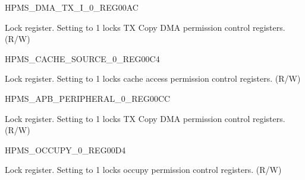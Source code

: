 \begin{register}{H}{PMS\_DMA\_TX\_I\_0\_REG}{\hexprefix{}00AC}\label{regdesc:PMSDMATXI0REG}
%
%
\regnewline%
\begin{regdesc}\begin{reglist}
\label{fielddesc:PMSDMATXILOCK}\item [PMS\_DMA\_TX\_I\_LOCK] Lock register. Setting to 1 locks TX Copy DMA permission control registers. (R/W)
\end{reglist}\end{regdesc}
\end{register}


\begin{register}{H}{PMS\_CACHE\_SOURCE\_0\_REG}{\hexprefix{}00C4}\label{regdesc:PMSCACHESOURCE0REG}
%
%
\regnewline%
\begin{regdesc}\begin{reglist}
\label{fielddesc:PMSCACHESOURCELOCK}\item [PMS\_CACHE\_SOURCE\_LOCK] Lock register. Setting to 1 locks cache access permission control registers. (R/W)
\end{reglist}\end{regdesc}
\end{register}


\begin{register}{H}{PMS\_APB\_PERIPHERAL\_0\_REG}{\hexprefix{}00CC}\label{regdesc:PMSAPBPERIPHERAL0REG}
%
%
\regnewline%
\begin{regdesc}\begin{reglist}
\label{fielddesc:PMSAPBPERIPHERALLOCK}\item [PMS\_APB\_PERIPHERAL\_LOCK] Lock register. Setting to 1 locks TX Copy DMA permission control registers. (R/W)
\end{reglist}\end{regdesc}
\end{register}


\begin{register}{H}{PMS\_OCCUPY\_0\_REG}{\hexprefix{}00D4}\label{regdesc:PMSOCCUPY0REG}
%
%
\regnewline%
\begin{regdesc}\begin{reglist}
\label{fielddesc:PMSOCCUPYLOCK}\item [PMS\_OCCUPY\_LOCK] Lock register. Setting to 1 locks occupy permission control registers. (R/W)
\end{reglist}\end{regdesc}
\end{register}


